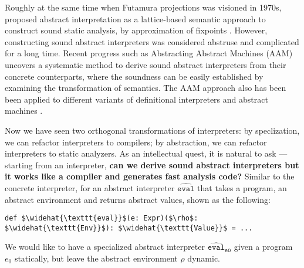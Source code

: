 Roughly at the same time when Futamura projections was visioned in 1970s,
\citeauthor{DBLP:conf/popl/CousotC77} proposed abstract interpretation as a
lattice-based semantic approach to construct sound static analysis, by
approximation of fixpoints \cite{DBLP:conf/popl/CousotC77}. However,
constructing sound abstract interpreters was considered abstruse and complicated
for a long time.
Recent progress such as Abstracting Abstract Machines (AAM)
uncovers a systematic method to derive sound abstract interpreters from their
concrete counterparts, where the soundness can be easily established by
examining the transformation of semantics.
The AAM approach also has been been applied to different variants of
definitional interpreters and abstract machines \cite{DBLP:journals/jfp/HornM12,
DBLP:conf/icfp/HornM10, DBLP:journals/pacmpl/DaraisLNH17}.

Now we have seen two orthogonal transformations of interpreters: by
speclization, we can refactor interpreters to compilers; by abstraction, we can
refactor interpreters to static analyzers. As an intellectual quest, it is
natural to ask --- starting from an interpreter, \textbf{can we derive sound abstract
interpreters but it works like a compiler and generates fast analysis code?}
Similar to the concrete interpreter, for an abstract interpreter
$\widehat{\texttt{eval}}$ that takes a program, an abstract environment and
returns abstract values, shown as the following:

\begin{lstlisting}
def $\widehat{\texttt{eval}}$(e: Expr)($\rho$: $\widehat{\texttt{Env}}$): $\widehat{\texttt{Value}}$ = ...
\end{lstlisting}

We would like to have a specialized abstract interpreter
$\widehat{\texttt{eval}}_{\texttt{e0}}$ given a program $e_0$ statically, but
leave the abstract environment $\rho$ dynamic.

